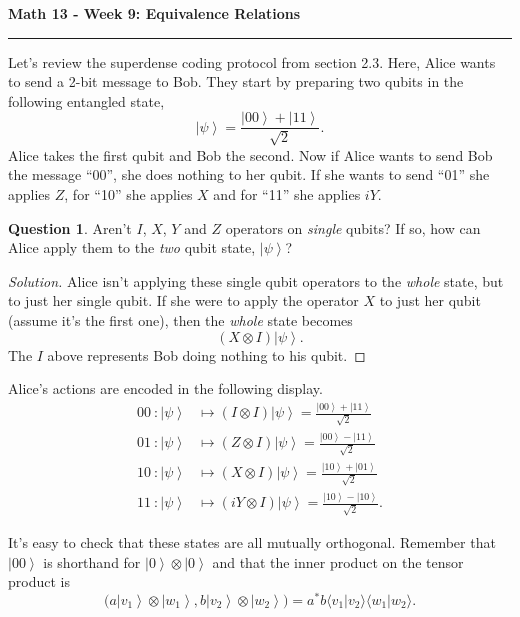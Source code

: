 \documentclass[12pt]{report}
\theoremstyle{definition}
\newtheorem{question}{Question}
\newcommand{\ket}[1]{\left|{#1}\right\rangle}
\begin{document}
\begin{center}
{\bf \Large Math 13 - Week 9: Equivalence Relations}
\vspace{0.2cm}
\hrule
\end{center}

Let's review the superdense coding protocol from section 2.3.
Here, Alice wants to send a 2-bit message to Bob.
They start by preparing two qubits in the following entangled state,
\begin{equation}
	\ket{\psi} = \frac{\ket{00} + \ket{11}}{\sqrt{2}}.
\end{equation}
Alice takes the first qubit and Bob the second.
Now if Alice wants to send Bob the message ``00'', she does nothing to her qubit.
If she wants to send ``01'' she applies $Z$, for ``10'' she applies $X$ and for ``11'' she applies $iY$.
\begin{question}
	Aren't $I$, $X$, $Y$ and $Z$ operators on \emph{single} qubits? If so, how can Alice apply them to the \emph{two} qubit state, $\ket{\psi}$?
\end{question}
\begin{proof}[Solution]
	Alice isn't applying these single qubit operators to the \emph{whole} state, but to just her single qubit.
	If she were to apply the operator $X$ to just her qubit (assume it's the first one), then the \emph{whole} state becomes
	\[
		(X\otimes I)\ket{\psi}.
	\]
	The $I$ above represents Bob doing nothing to his qubit.
\end{proof}

Alice's actions are encoded in the following display.
\begin{equation}
\begin{split}
	00\ : \ket{\psi} & \mapsto (I\otimes I)\ket{\psi} = \frac{\ket{00} + \ket{11}}{\sqrt{2}}\\
	01\ : \ket{\psi} & \mapsto (Z\otimes I)\ket{\psi} = \frac{\ket{00} - \ket{11}}{\sqrt{2}}\\
	10\ : \ket{\psi} & \mapsto (X\otimes I)\ket{\psi} = \frac{\ket{10} + \ket{01}}{\sqrt{2}}\\
	11\ : \ket{\psi} & \mapsto (iY\otimes I)\ket{\psi}= \frac{\ket{10} - \ket{10}}{\sqrt{2}}.
\end{split}
\end{equation}

It's easy to check that these states are all mutually orthogonal.
Remember that $\ket{00}$ is shorthand for $\ket{0}\otimes \ket{0}$ and that the inner product on the tensor product is
\[
	\big(a\ket{v_1}\otimes \ket{w_1}, b\ket{v_2}\otimes \ket{w_2}\big) = a^*b \langle v_1|v_2\rangle \langle w_1 | w_2\rangle.
\]
\end{document}
